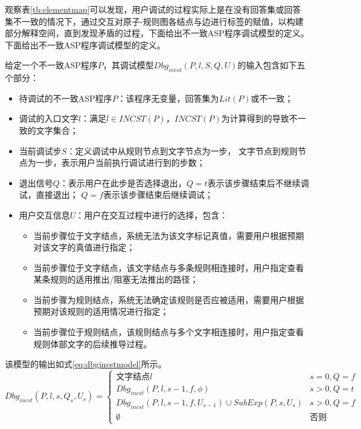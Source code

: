     观察表\ref{tb:elementmap}可以发现，用户调试的过程实际上是在没有回答集或回答集不一致的情况下，通过交互对原子-规则图各结点与边进行标签的赋值，以构建部分解释空间，直到发现矛盾的过程，下面给出不一致ASP程序调试模型的定义。下面给出不一致ASP程序调试模型的定义。
    \begin{definition}[]
        给定一个不一致ASP程序$P$，其调试模型$Dbg_{incst}(P, l, S, Q, U)$的输入包含如下五个部分：
        \begin{itemize}[topsep=0pt]
            \setlength\itemsep{-0.3em}
            \item 待调试的不一致ASP程序$P$：该程序无变量，回答集为$Lit(P)$或不一致；
            \item 调试的入口文字$l$：满足$l \in INCST(P)$，$INCST(P)$为计算得到的导致不一致的文字集合；
            \item 当前调试步$S$：定义调试中从规则节点到文字节点为一步， 文字节点到规则节点为一步，表示用户当前执行调试进行到的步数；
            \item 退出信号$Q$：表示用户在此步是否选择退出，$Q=t$表示该步骤结束后不继续调试，直接退出； $Q=f$表示该步骤结束后继续调试；
            \item 用户交互信息$U$：用户在交互过程中进行的选择，包含：
            \begin{itemize}[topsep=0pt, label=$\circ$]
                \setlength\itemsep{-0.3em}
                \item 当前步骤位于文字结点，系统无法为该文字标记真值，需要用户根据预期对该文字的真值进行指定；
                \item 当前步骤位于文字结点，该文字结点与多条规则相连接时，用户指定查看某条规则的适用推出/阻塞无法推出的路径；
                \item 当前步骤为规则结点，系统无法确定该规则是否应被适用，需要用户根据预期对该规则的适用情况进行指定；
                \item 当前步骤位于规则结点，该规则结点与多个文字相连接时，用户指定查看规则体部文字的后续推导过程。
            \end{itemize}
        \end{itemize}
    \end{definition}
        
        该模型的输出如式\eqref{eq:dbgincstmodel}所示。
        \begin{equation}
            \label{eq:dbgincstmodel}
            Dbg_{incst}(P, l, s, Q_s, U_s)=
            \begin{cases}
                \text{文字结点} l &s = 0, Q = f\\
                Dbg_{incst}(P, l, s-1, f, \phi) &s > 0, Q = t\\
                Dbg_{incst}(P, l, s-1, f, U_{s-1}) \cup SubExp(P, s, U_s) &s > 0, Q = f\\
                \emptyset &\text{否则}
            \end{cases}
        \end{equation}
    
